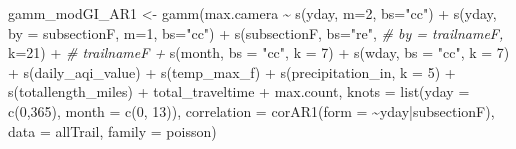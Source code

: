 \documentclass[
]{book}
\newenvironment{Shaded}{\begin{snugshade}}{\end{snugshade}}
\newcommand{\AttributeTok}[1]{\textcolor[rgb]{0.77,0.63,0.00}{#1}}
\newcommand{\CommentTok}[1]{\textcolor[rgb]{0.56,0.35,0.01}{\textit{#1}}}
\newcommand{\DecValTok}[1]{\textcolor[rgb]{0.00,0.00,0.81}{#1}}
\newcommand{\FunctionTok}[1]{\textcolor[rgb]{0.00,0.00,0.00}{#1}}
\newcommand{\NormalTok}[1]{#1}
\newcommand{\OtherTok}[1]{\textcolor[rgb]{0.56,0.35,0.01}{#1}}
\newcommand{\SpecialCharTok}[1]{\textcolor[rgb]{0.00,0.00,0.00}{#1}}
\newcommand{\StringTok}[1]{\textcolor[rgb]{0.31,0.60,0.02}{#1}}
\begin{document}
\begin{Shaded}
\begin{Highlighting}[]
\NormalTok{ gamm\_modGI\_AR1 }\OtherTok{\textless{}{-}} \FunctionTok{gamm}\NormalTok{(max.camera }\SpecialCharTok{\textasciitilde{}}
                           \FunctionTok{s}\NormalTok{(yday, }\AttributeTok{m=}\DecValTok{2}\NormalTok{, }\AttributeTok{bs=}\StringTok{"cc"}\NormalTok{) }\SpecialCharTok{+}
                           \FunctionTok{s}\NormalTok{(yday, }\AttributeTok{by =}\NormalTok{ subsectionF,}
                             \AttributeTok{m=}\DecValTok{1}\NormalTok{, }\AttributeTok{bs=}\StringTok{"cc"}\NormalTok{) }\SpecialCharTok{+}
                           \FunctionTok{s}\NormalTok{(subsectionF,}
                             \AttributeTok{bs=}\StringTok{"re"}\NormalTok{,}
                             \CommentTok{\# by = trailnameF,}
                             \AttributeTok{k=}\DecValTok{21}\NormalTok{) }\SpecialCharTok{+}
                           \CommentTok{\# trailnameF +}
                           \FunctionTok{s}\NormalTok{(month, }\AttributeTok{bs =} \StringTok{"cc"}\NormalTok{,  }\AttributeTok{k =} \DecValTok{7}\NormalTok{) }\SpecialCharTok{+}
                           \FunctionTok{s}\NormalTok{(wday,}
                             \AttributeTok{bs =} \StringTok{"cc"}\NormalTok{, }\AttributeTok{k =} \DecValTok{7}\NormalTok{) }\SpecialCharTok{+}
                           \FunctionTok{s}\NormalTok{(daily\_aqi\_value) }\SpecialCharTok{+}
                           \FunctionTok{s}\NormalTok{(temp\_max\_f) }\SpecialCharTok{+}
                           \FunctionTok{s}\NormalTok{(precipitation\_in, }\AttributeTok{k =} \DecValTok{5}\NormalTok{) }\SpecialCharTok{+}
                          \FunctionTok{s}\NormalTok{(totallength\_miles) }\SpecialCharTok{+} 
\NormalTok{                        total\_traveltime }\SpecialCharTok{+}
\NormalTok{                            max.count,}
                          \AttributeTok{knots =} \FunctionTok{list}\NormalTok{(}\AttributeTok{yday =} \FunctionTok{c}\NormalTok{(}\DecValTok{0}\NormalTok{,}\DecValTok{365}\NormalTok{),}
                                       \AttributeTok{month =} \FunctionTok{c}\NormalTok{(}\DecValTok{0}\NormalTok{, }\DecValTok{13}\NormalTok{)),}
                           \AttributeTok{correlation =} \FunctionTok{corAR1}\NormalTok{(}\AttributeTok{form =} \SpecialCharTok{\textasciitilde{}}\NormalTok{yday}\SpecialCharTok{|}\NormalTok{subsectionF),}
                         \AttributeTok{data =}\NormalTok{ allTrail,}
                         \AttributeTok{family =}\NormalTok{ poisson)}
\end{Highlighting}
\end{Shaded}
\end{document}
